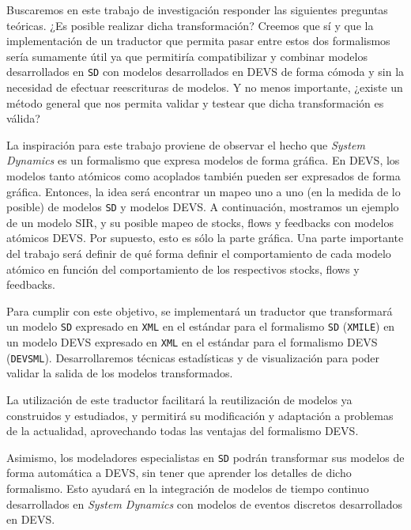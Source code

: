 Buscaremos en este trabajo de investigación responder las siguientes preguntas teóricas.
¿Es posible realizar dicha transformación? Creemos que sí y que la implementación de un traductor que permita pasar entre estos dos formalismos sería sumamente útil ya que permitiría compatibilizar y combinar modelos desarrollados en \texttt{SD} con modelos desarrollados en DEVS de forma cómoda y sin la necesidad de efectuar reescrituras de modelos.
Y no menos importante, ¿existe un método general que nos permita validar y testear que dicha transformación es válida?

La inspiración para este trabajo proviene de observar el hecho que \textit{System Dynamics} es un formalismo que expresa modelos de forma gráfica. En DEVS, los modelos tanto atómicos como acoplados también pueden ser expresados de forma gráfica. Entonces, la idea será encontrar un mapeo uno a uno (en la medida de lo posible) de modelos \texttt{SD} y modelos DEVS. A continuación, mostramos un ejemplo de un modelo SIR, y su posible mapeo de stocks, flows y feedbacks con modelos atómicos DEVS. Por supuesto, esto es sólo la parte gráfica. Una parte importante del trabajo será definir de qué forma definir el comportamiento de cada modelo atómico en función del comportamiento de los respectivos stocks, flows y feedbacks.

Para cumplir con este objetivo, se implementará un traductor que transformará un modelo \texttt{SD} expresado en \texttt{XML}\cite{xml} en el estándar para el formalismo \texttt{SD} (\texttt{XMILE}) en un modelo DEVS expresado en \texttt{XML} en el estándar para el formalismo DEVS (\texttt{DEVSML}).
Desarrollaremos técnicas estadísticas y de visualización para poder validar la salida de los modelos transformados.

La utilización de este traductor facilitará la reutilización de modelos ya construidos y estudiados, y permitirá su modificación y adaptación a problemas de la actualidad, aprovechando todas las ventajas del formalismo DEVS.

Asimismo, los modeladores especialistas en \texttt{SD} podrán transformar sus modelos de forma automática a DEVS, sin tener que aprender los detalles de dicho formalismo. Esto ayudará en la integración de modelos de tiempo continuo desarrollados en \textit{System Dynamics} con modelos de eventos discretos desarrollados en DEVS.



